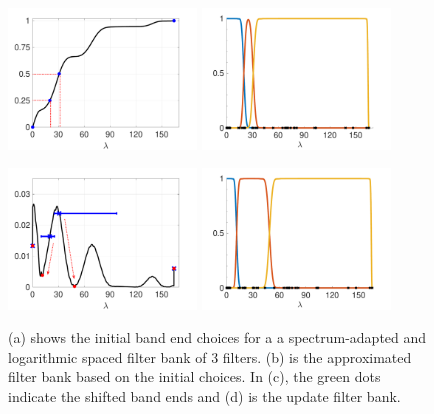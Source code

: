 \documentclass[a4paper]{article}
\theoremstyle{definition}
\begin{document}
\begin{figure}[h]
\centering
\includegraphics[width = 5cm]{cdf.pdf}
\includegraphics[width = 5cm]{original filter bank.pdf}

\includegraphics[width = 5cm]{pdf.pdf}
\includegraphics[width = 5cm]{updated filter bank.pdf}

\caption{(a) shows the initial band end choices for a a spectrum-adapted and logarithmic spaced filter bank of 3 filters. (b) is the approximated filter bank based on the initial choices. In (c), the green dots indicate the shifted band ends and (d) is the update filter bank.}
\end{figure}
\end{document}
